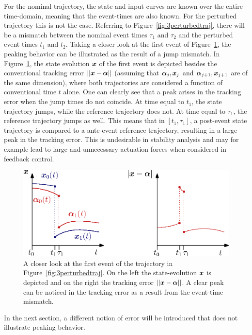 \documentclass[../DC2019003Bouma.tex]{subfiles}
\begin{document}
For the nominal trajectory, the state and input curves are known over the entire time-domain, meaning that the event-times are also known. For the perturbed trajectory this is not the case. Referring to Figure~\ref{fig:3perturbedtraj}, there will be a mismatch between the nominal event times $\tau_1$ and $\tau_2$ and the perturbed event times $t_1$ and $t_2$. Taking a closer look at the first event of Figure~\ref{fig:3peakerror}, the peaking behavior can be illustrated as the result of a jump mismatch. In Figure~\ref{fig:3peakerror}, the state evolution ${\boldsymbol{x}}$ of the first event is depicted besides the conventional tracking error $||{\boldsymbol{x}}-\boldsymbol{\alpha}||$ (assuming that $\boldsymbol{\alpha}_j,{\boldsymbol{x}}_j$ and $\boldsymbol{\alpha}_{j+1},{\boldsymbol{x}}_{j+1}$ are of the same dimension), where both trajectories are considered a function of conventional time $t$ alone. One can clearly see that a peak arises in the tracking error when the jump times do not coincide. At time equal to $t_1$, the state trajectory jumps, while the reference trajectory does not. At time equal to $\tau_1$, the reference trajectory jumps as well. This means that in $[t_1,\tau_1]$, a post-event state trajectory is compared to a ante-event reference trajectory, resulting in a large peak in the tracking error. This is undesirable in stability analysis and may for example lead to large and unnecessary actuation forces when considered in feedback control.

\begin{figure}[bt!]
\centering
\includegraphics[width=.66\textwidth]{peakerror.eps}\caption{A closer look at the first event of the trajectory in Figure~\ref{fig:3perturbedtraj}. On the left the state-evolution ${\boldsymbol{x}}$ is depicted and on the right the tracking error $||{\boldsymbol{x}}-\boldsymbol{\alpha}||$. A clear peak can be noticed in the tracking error as a result from the event-time mismatch.} \label{fig:3peakerror}
\end{figure}

In the next section, a different notion of error will be introduced that does not illustrate peaking behavior.
%
%
%
%
%
\end{document}
